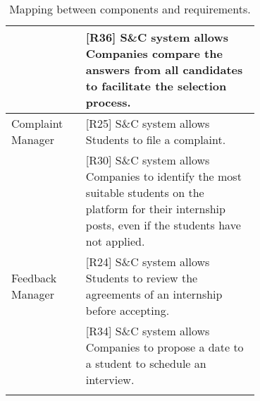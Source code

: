 \begin{center}
\begin{longtable}{| l |p{0.7\linewidth} |}
        & [R36] S\&C system allows Companies compare the answers from all candidates to facilitate the selection process.\\ \hline 
        Complaint Manager 
        & [R25] S\&C system allows Students to file a complaint.\\
        & [R30] S\&C system allows Companies to identify the most suitable students on the platform for their internship posts, even if the students have not applied.\\ \hline
        Feedback Manager
        &[R24] S\&C system allows Students to review the agreements of an internship before accepting.\\
        &[R34] S\&C system allows Companies to propose a date to a student to schedule an interview.\\ \hline
        \caption{Mapping between components and requirements.}
    \end{longtable}
\end{center}

